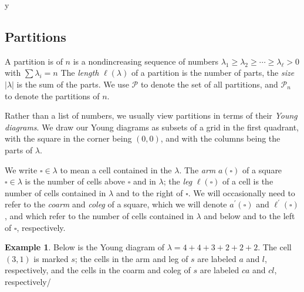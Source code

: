 y\documentclass{amsart}[12pt]
\theoremstyle{definition}
\newtheorem{example}[dummy]{Example}
\newcommand{\PP}{\mathcal{P}} %
\begin{document}
\subsection{Partitions}


A partition is of $n$ is a nondincreasing sequence of numbers $\lambda_1\geq \lambda_2\geq \cdots \geq \lambda_\ell > 0$ with $\sum \lambda_i=n$  The \emph{length} $\ell(\lambda)$ of a partition is the number of parts, the \emph{size} $|\lambda|$ is the sum of the parts.  We use $\PP$ to denote the set of all partitions, and $\PP_n$ to denote the partitions of $n$.

Rather than a list of numbers, we usually view partitions in terms of their \emph{Young diagrams}.  We draw our Young diagrams as subsets of a grid in the first quadrant, with the square in the corner being $(0,0)$, and with the columns being the parts of $\lambda$.

We write $\square\in\lambda$ to mean a cell contained in the $\lambda$.  The \emph{arm} $a(\square)$ of a square $\square\in\lambda$ is the number of cells above $\square$ and in $\lambda$; the \emph{leg} $\ell(\square)$ of a cell is the number of cells contained in $\lambda$ and to the right of $\square$.  We will occasionally need to refer to the \emph{coarm} and \emph{coleg} of a square, which we will denote $a^\prime(\square)$ and $\ell^\prime(\square)$, and which refer to the number of cells contained in $\lambda$ and below and to the left of $\square$, respectively. 

\begin{example}
Below is the Young diagram of $\lambda=4+4+3+2+2+2$.  The cell $(3,1)$ is marked $s$; the cells in the arm and leg of $s$ are labeled $a$ and $l$, respectively, and the cells in the coarm and coleg of $s$ are labeled $ca$ and $cl$, respectively/
\begin{center}
\end{center}
\end{example}
\end{document}
